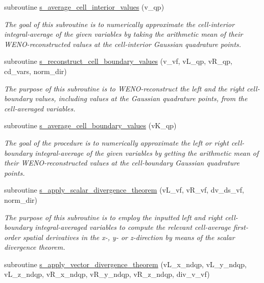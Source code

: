 \begin{DoxyCompactItemize}
subroutine \hyperlink{namespacem__rhs_ab3b720ac99f76621fd7086da9405490f}{s\+\_\+average\+\_\+cell\+\_\+interior\+\_\+values} (v\+\_\+qp)
\begin{DoxyCompactList}\small\item\em The goal of this subroutine is to numerically approximate the cell-\/interior integral-\/average of the given variables by taking the arithmetic mean of their W\+E\+N\+O-\/reconstructed values at the cell-\/interior Gaussian quadrature points. \end{DoxyCompactList}\item 
subroutine \hyperlink{namespacem__rhs_ac5aa3e8228234f05fd5b899a6d309260}{s\+\_\+reconstruct\+\_\+cell\+\_\+boundary\+\_\+values} (v\+\_\+vf, v\+L\+\_\+qp, v\+R\+\_\+qp, cd\+\_\+vars, norm\+\_\+dir)
\begin{DoxyCompactList}\small\item\em The purpose of this subroutine is to W\+E\+N\+O-\/reconstruct the left and the right cell-\/boundary values, including values at the Gaussian quadrature points, from the cell-\/averaged variables. \end{DoxyCompactList}\item 
subroutine \hyperlink{namespacem__rhs_ada159015fa6f204a01a0c1b254affdae}{s\+\_\+average\+\_\+cell\+\_\+boundary\+\_\+values} (v\+K\+\_\+qp)
\begin{DoxyCompactList}\small\item\em The goal of the procedure is to numerically approximate the left or right cell-\/boundary integral-\/average of the given variables by getting the arithmetic mean of their W\+E\+N\+O-\/reconstructed values at the cell-\/boundary Gaussian quadrature points. \end{DoxyCompactList}\item 
subroutine \hyperlink{namespacem__rhs_ac7d49938e97f8843c84f335ff0f6cceb}{s\+\_\+apply\+\_\+scalar\+\_\+divergence\+\_\+theorem} (v\+L\+\_\+vf, v\+R\+\_\+vf, dv\+\_\+ds\+\_\+vf, norm\+\_\+dir)
\begin{DoxyCompactList}\small\item\em The purpose of this subroutine is to employ the inputted left and right cell-\/boundary integral-\/averaged variables to compute the relevant cell-\/average first-\/order spatial derivatives in the x-\/, y-\/ or z-\/direction by means of the scalar divergence theorem. \end{DoxyCompactList}\item 
subroutine \hyperlink{namespacem__rhs_ad6141c10a72d8ff3a9fb5f16b89bdcc3}{s\+\_\+apply\+\_\+vector\+\_\+divergence\+\_\+theorem} (v\+L\+\_\+x\+\_\+ndqp, v\+L\+\_\+y\+\_\+ndqp, v\+L\+\_\+z\+\_\+ndqp, v\+R\+\_\+x\+\_\+ndqp, v\+R\+\_\+y\+\_\+ndqp, v\+R\+\_\+z\+\_\+ndqp, div\+\_\+v\+\_\+vf)

\end{DoxyCompactItemize}
